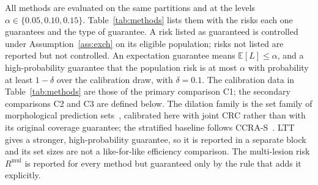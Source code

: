 \documentclass[sn-mathphys-num]{sn-jnl}%
\theoremstyle{thmstyleone}
\theoremstyle{thmstyletwo}
\theoremstyle{thmstylethree}
\newcommand{\E}{\mathbb{E}}
\newcommand{\1}{\mathbb{1}}
\newcommand{\mul}{\mathrm{mul}}
\begin{document}
All methods are evaluated on the same partitions and at the levels $\alpha\in\{0.05,0.10,0.15\}$. Table~\ref{tab:methods} lists them with the risks each one guarantees and the type of guarantee. A risk listed as guaranteed is controlled under Assumption~\ref{ass:exch} on its eligible population; risks not listed are reported but not controlled. An expectation guarantee means $\E[L]\le\alpha$, and a high-probability guarantee that the population risk is at most $\alpha$ with probability at least $1-\delta$ over the calibration draw, with $\delta=0.1$. The calibration data in Table~\ref{tab:methods} are those of the primary comparison C1; the secondary comparisons C2 and C3 are defined below. The dilation family is the set family of morphological prediction sets~\cite{mossina2025morph}, calibrated here with joint CRC rather than with its original coverage guarantee; the stratified baseline follows CCRA-S~\cite{luo2025ccra}. LTT~\cite{angelopoulos2025ltt} gives a stronger, high-probability guarantee, so it is reported in a separate block and its set sizes are not a like-for-like efficiency comparison. The multi-lesion risk $R^{\mul}$ is reported for every method but guaranteed only by the rule that adds it explicitly.
\end{document}
